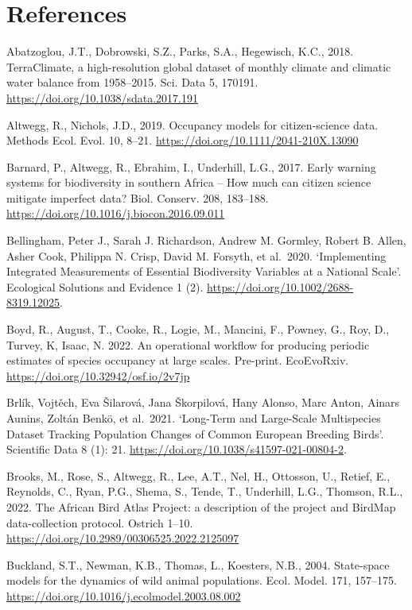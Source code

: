 \documentclass[utf8]{frontiersSCNS}
\begin{document}
\hypertarget{references}{%
\section*{References}\label{references}}

Abatzoglou, J.T., Dobrowski, S.Z., Parks, S.A., Hegewisch, K.C., 2018.
TerraClimate, a high-resolution global dataset of monthly climate and
climatic water balance from 1958--2015. Sci. Data 5, 170191.
\url{https://doi.org/10.1038/sdata.2017.191}

Altwegg, R., Nichols, J.D., 2019. Occupancy models for citizen‐science
data. Methods Ecol. Evol. 10, 8--21.
\url{https://doi.org/10.1111/2041-210X.13090}

Barnard, P., Altwegg, R., Ebrahim, I., Underhill, L.G., 2017. Early
warning systems for biodiversity in southern Africa -- How much can
citizen science mitigate imperfect data? Biol. Conserv. 208, 183--188.
\url{https://doi.org/10.1016/j.biocon.2016.09.011}

Bellingham, Peter J., Sarah J. Richardson, Andrew M. Gormley, Robert B.
Allen, Asher Cook, Philippa N. Crisp, David M. Forsyth, et al.~2020.
`Implementing Integrated Measurements of Essential Biodiversity
Variables at a National Scale'. Ecological Solutions and Evidence 1 (2).
\url{https://doi.org/10.1002/2688-8319.12025}.

Boyd, R., August, T., Cooke, R., Logie, M., Mancini, F., Powney, G.,
Roy, D., Turvey, K, Isaac, N. 2022. An operational workflow for
producing periodic estimates of species occupancy at large scales.
Pre-print. EcoEvoRxiv. \url{https://doi.org/10.32942/osf.io/2v7jp}

Brlík, Vojtěch, Eva Šilarová, Jana Škorpilová, Hany Alonso, Marc Anton,
Ainars Aunins, Zoltán Benkö, et al.~2021. `Long-Term and Large-Scale
Multispecies Dataset Tracking Population Changes of Common European
Breeding Birds'. Scientific Data 8 (1): 21.
\url{https://doi.org/10.1038/s41597-021-00804-2}.

Brooks, M., Rose, S., Altwegg, R., Lee, A.T., Nel, H., Ottosson, U.,
Retief, E., Reynolds, C., Ryan, P.G., Shema, S., Tende, T., Underhill,
L.G., Thomson, R.L., 2022. The African Bird Atlas Project: a description
of the project and BirdMap data-collection protocol. Ostrich 1--10.
\url{https://doi.org/10.2989/00306525.2022.2125097}

Buckland, S.T., Newman, K.B., Thomas, L., Koesters, N.B., 2004.
State-space models for the dynamics of wild animal populations. Ecol.
Model. 171, 157--175.
\url{https://doi.org/10.1016/j.ecolmodel.2003.08.002}
\end{document}
